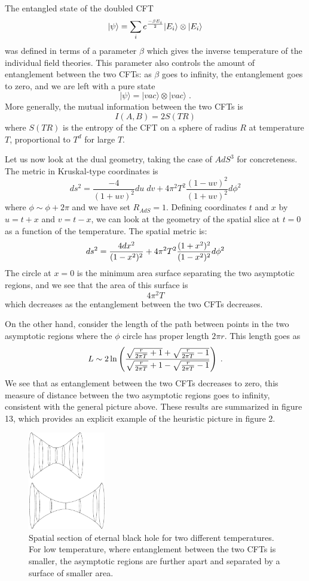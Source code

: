 \documentclass[12pt,epsf]{article}
\newcommand{\be}{\begin{equation}}
\newcommand{\ee}{\end{equation}}
\renewcommand{\(}{\left(}
\renewcommand{\)}{\right)}
\begin{document}
The entangled state of the doubled CFT
\be
|\psi \rangle = \sum_i e^{- \beta E_i \over 2} | E_i \rangle \otimes | E_i \rangle
\ee
was defined in terms of a parameter $\beta$ which gives the inverse temperature of the individual field theories. This parameter also controls the amount of entanglement between the two CFTs: as $\beta$ goes to infinity, the entanglement goes to zero, and we are left with a pure state
\[
|\psi \rangle = |vac \rangle \otimes |vac \rangle \; .
\]
More generally, the mutual information between the two CFTs is
\[
I(A,B) = 2S(TR)
\]
where $S(TR)$ is the entropy of the CFT on a sphere of radius $R$ at temperature $T$, proportional to $T^d$ for large $T$.

Let us now look at the dual geometry, taking the case of $AdS^3$ for concreteness. The metric in Kruskal-type coordinates is \cite{eads}
\[
ds^2 = \frac{-4}{(1+uv)^2}du \; dv + 4 \pi^2 T^2 \frac{(1-uv)^2}{(1+uv)^2}d \phi^2
\]
where $\phi \sim \phi + 2 \pi$ and we have set $R_{AdS}=1$. Defining coordinates $t$ and $x$ by $u=t+x$ and $v=t-x$, we can look at the geometry of the spatial slice at $t=0$ as a function of the temperature. The spatial metric is:
\[
ds^2 = {4 dx^2 \over (1-x^2)^2} + 4 \pi^2 T^2 {(1+x^2)^2 \over (1-x^2)^2} d \phi^2
\]
The circle at $x=0$ is the minimum area surface separating the two asymptotic regions, and we see that the area of this surface is
\[
4 \pi^2 T
\]
which decreases as the entanglement between the two CFTs decreases.

On the other hand, consider the length of the path between points in the two asymptotic regions where the $\phi$ circle has proper length $2 \pi r$. This length goes as
\[
L \sim 2 \ln \left( {\sqrt{{r \over 2 \pi T} + 1} + \sqrt{{r \over 2 \pi T} - 1} \over \sqrt{r \over 2 \pi T} + 1 - \sqrt{{r \over 2 \pi T} - 1}} \right) \; .
\]
We see that as entanglement between the two CFTs decreases to zero, this measure of distance between the two asymptotic regions goes to infinity, consistent with the general picture above. These results are summarized in figure 13, which provides an explicit example of the heuristic picture in figure 2.

\begin{figure}
\centering
\includegraphics[width=0.3\textwidth]{throats.eps}
\caption{Spatial section of eternal black hole for two different temperatures. For low temperature, where entanglement between the two CFTs is smaller, the asymptotic regions are further apart and separated by a surface of smaller area.}
\end{figure}
\end{document}
